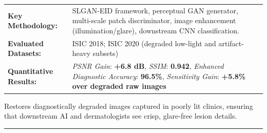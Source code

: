 \documentclass[10pt,a4paper]{article}
\begin{document}
\vspace{4pt}
\begin{tabularx}{\linewidth}{p{3.2cm}X}
\toprule
\textbf{Key Methodology:} & SLGAN-EID framework, perceptual GAN generator, multi-scale patch discriminator, image enhancement (illumination/glare), downstream CNN classification. \\
\textbf{Evaluated Datasets:} & ISIC 2018; ISIC 2020 (degraded low-light and artifact-heavy subsets) \\
\textbf{Quantitative Results:} & \textit{PSNR Gain}: \textbf{+6.8 dB}, \textit{SSIM}: \textbf{0.942}, \textit{Enhanced Diagnostic Accuracy}: \textbf{96.5\%}, \textit{Sensitivity Gain}: \textbf{+5.8\% over degraded raw images} \\
\bottomrule
\end{tabularx}
\vspace{4pt}
\begin{tcolorbox}[utilitybox,title=Clinical Utility and Real-World Impact]
Restores diagnostically degraded images captured in poorly lit clinics, ensuring that downstream AI and dermatologists see crisp, glare-free lesion details.
\end{tcolorbox}
\vspace{12pt}
\hrule
\vspace{12pt}
\end{document}

